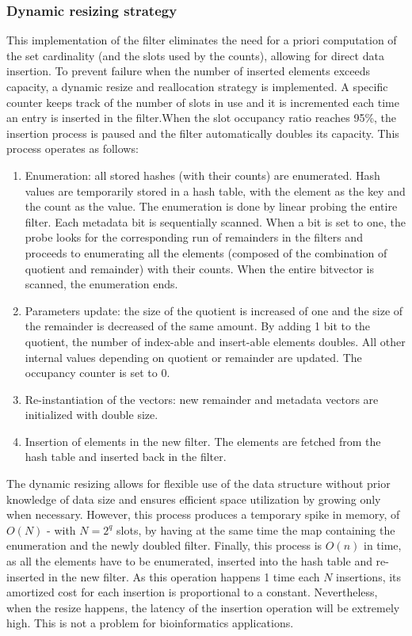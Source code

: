 \subsubsection{Dynamic resizing strategy}
This implementation of the filter eliminates the need for a priori computation of the \kmer set cardinality (and the slots used by the counts), allowing for direct data insertion. To prevent failure when the number of inserted elements exceeds capacity, a dynamic resize and reallocation strategy is implemented. A specific counter keeps track of the number of slots in use and it is incremented each time an entry is inserted in the filter.When the slot occupancy ratio reaches 95\%, the insertion process is paused and the filter automatically doubles its capacity. This process operates as follows: 
\begin{enumerate}
	\item Enumeration: all stored hashes (with their counts) are enumerated. Hash values are temporarily stored in a hash table, with the element as the key and the count as the value. The enumeration is done by linear probing the entire filter. Each \occ metadata bit is sequentially scanned. When a bit is set to one, the probe looks for the corresponding run of remainders in the filters and proceeds to enumerating all the elements (composed of the combination of quotient and remainder) with their counts. When the entire \occs bitvector is scanned, the enumeration ends.
	\item Parameters update: the size of the quotient is increased of one and the size of the remainder is decreased of the same amount. By adding 1 bit to the quotient, the number of index-able and insert-able elements doubles. All other internal values depending on quotient or remainder are updated. The occupancy counter is set to 0.
	\item Re-instantiation of the vectors: new remainder and metadata vectors are initialized with double size.
	\item Insertion of elements in the new filter. The elements are fetched from the hash table and inserted back in the filter.
\end{enumerate}
The dynamic resizing allows for flexible use of the data structure without prior knowledge of data size and ensures efficient space utilization by growing only when necessary. However, this process produces a temporary spike in memory, of $O(N)$ - with $N = 2^q $ slots, by having at the same time the map containing the enumeration and the newly doubled filter. Finally, this process is $O(n)$ in time, as all the elements have to be enumerated, inserted into the hash table and re-inserted in the new filter. As this operation happens 1 time each $N$ insertions, its amortized cost for each insertion is proportional to a constant. Nevertheless, when the resize happens, the latency of the insertion operation will be extremely high. This is not a problem for bioinformatics applications.

